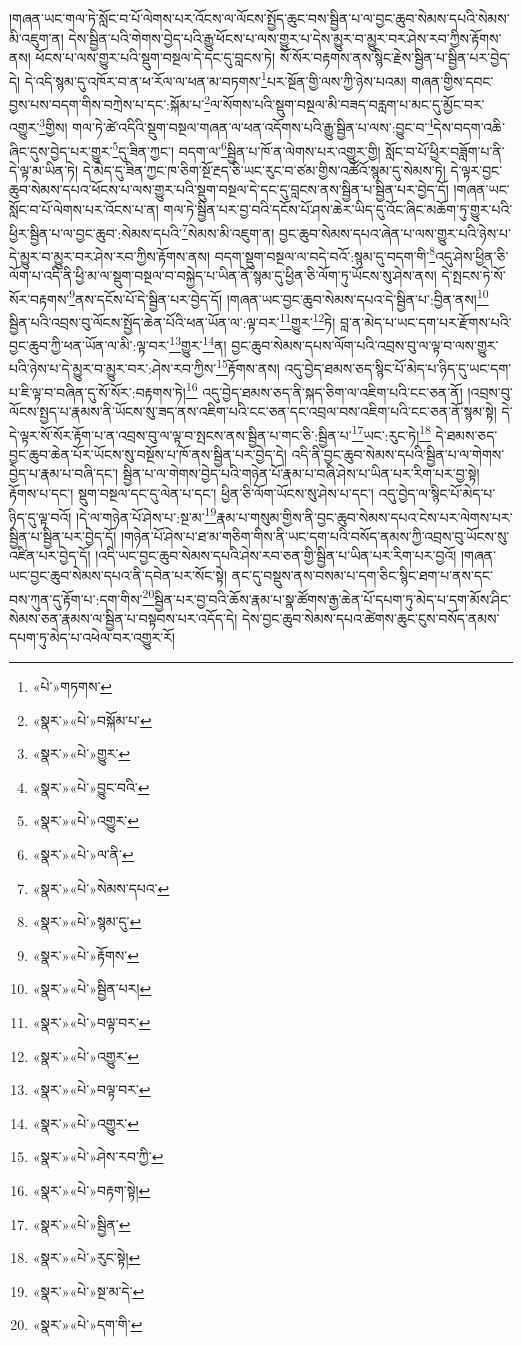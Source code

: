།གཞན་ཡང་གལ་ཏེ་སློང་བ་པོ་ལེགས་པར་འོངས་ལ་ལོངས་སྤྱོད་ཆུང་བས་སྦྱིན་པ་ལ་བྱང་ཆུབ་སེམས་དཔའི་སེམས་མི་འཇུག་ན། དེས་སྦྱིན་པའི་གེགས་བྱེད་པའི་རྒྱུ་ཕོངས་པ་ལས་གྱུར་པ་དེས་མྱུར་བ་མྱུར་བར་ཤེས་རབ་ཀྱིས་རྟོགས་ནས། ཕོངས་པ་ལས་གྱུར་པའི་སྡུག་བསྔལ་དེ་དང་དུ་བླངས་ཏེ། སོ་སོར་བརྟགས་ནས་སྙིང་རྗེས་སྦྱིན་པ་སྦྱིན་པར་བྱེད་དེ། དེ་འདི་སྙམ་དུ་འཁོར་བ་ན་ཕ་རོལ་ལ་ཕན་མ་བཏགས་\footnote{«པེ་»གཏགས་}པར་སྔོན་གྱི་ལས་ཀྱི་ཉེས་པའམ། གཞན་གྱིས་དབང་བྱས་པས་བདག་གིས་བཀྲེས་པ་དང་:སྐོམ་པ་\footnote{«སྣར་»«པེ་»བསྐོམ་པ་}ལ་སོགས་པའི་སྡུག་བསྔལ་མི་བཟད་བརླག་པ་མང་དུ་མྱོང་བར་འགྱུར་\footnote{«སྣར་»«པེ་»གྱུར་}གྱིས། གལ་ཏེ་ཚེ་འདིའི་སྡུག་བསྔལ་གཞན་ལ་ཕན་འདོགས་པའི་རྒྱུ་སྦྱིན་པ་ལས་:བྱུང་བ་\footnote{«སྣར་»«པེ་»བྱུང་བའི་}དེས་བདག་འཆི་ཞིང་དུས་བྱེད་པར་གྱུར་\footnote{«སྣར་»«པེ་»འགྱུར་}དུ་ཟིན་ཀྱང་། བདག་ལ་\footnote{«སྣར་»«པེ་»ལ་ནི་}སྦྱིན་པ་ཁོ་ན་ལེགས་པར་འགྱུར་གྱི། སློང་བ་པོ་ཕྱིར་བཟློག་པ་ནི་དེ་ལྟ་མ་ཡིན་ཏེ། དེ་མེད་དུ་ཟིན་ཀྱང་ཁ་ཅིག་སྔོ་རྔད་ཅི་ཡང་རུང་བ་ཙམ་གྱིས་འཚོའོ་སྙམ་དུ་སེམས་ཏེ། དེ་ལྟར་བྱང་ཆུབ་སེམས་དཔའ་ཕོངས་པ་ལས་གྱུར་པའི་སྡུག་བསྔལ་དེ་དང་དུ་བླངས་ནས་སྦྱིན་པ་སྦྱིན་པར་བྱེད་དོ། །གཞན་ཡང་སློང་བ་པོ་ལེགས་པར་འོངས་པ་ན། གལ་ཏེ་སྦྱིན་པར་བྱ་བའི་དངོས་པོ་ཤས་ཆེར་ཡིད་དུ་འོང་ཞིང་མཆོག་ཏུ་གྱུར་པའི་ཕྱིར་སྦྱིན་པ་ལ་བྱང་ཆུབ་:སེམས་དཔའི་\footnote{«སྣར་»«པེ་»སེམས་དཔའ་}སེམས་མི་འཇུག་ན། བྱང་ཆུབ་སེམས་དཔའ་ཞེན་པ་ལས་གྱུར་པའི་ཉེས་པ་དེ་མྱུར་བ་མྱུར་བར་ཤེས་རབ་ཀྱིས་རྟོགས་ནས། བདག་སྡུག་བསྔལ་ལ་བདེ་བའོ་:སྙམ་དུ་བདག་གི་\footnote{«སྣར་»«པེ་»སྙམ་དུ་}འདུ་ཤེས་ཕྱིན་ཅི་ལོག་པ་འདི་ནི་ཕྱི་མ་ལ་སྡུག་བསྔལ་བ་བསྐྱེད་པ་ཡིན་ནོ་སྙམ་དུ་ཕྱིན་ཅི་ལོག་ཏུ་ཡོངས་སུ་ཤེས་ནས། དེ་སྤངས་ཏེ་སོ་སོར་བརྟགས་\footnote{«སྣར་»«པེ་»རྟོགས་}ནས་དངོས་པོ་དེ་སྦྱིན་པར་བྱེད་དོ། །གཞན་ཡང་བྱང་ཆུབ་སེམས་དཔའ་དེ་སྦྱིན་པ་:བྱིན་ནས།\footnote{«སྣར་»«པེ་»སྦྱིན་པར།} སྦྱིན་པའི་འབྲས་བུ་ལོངས་སྤྱོད་ཆེན་པོའི་ཕན་ཡོན་ལ་:ལྟ་བར་\footnote{«སྣར་»«པེ་»བལྟ་བར་}གྱུར་\footnote{«སྣར་»«པེ་»འགྱུར་}ཏེ། བླ་ན་མེད་པ་ཡང་དག་པར་རྫོགས་པའི་བྱང་ཆུབ་ཀྱི་ཕན་ཡོན་ལ་མི་:ལྟ་བར་\footnote{«སྣར་»«པེ་»བལྟ་བར་}གྱུར་\footnote{«སྣར་»«པེ་»འགྱུར་}ན། བྱང་ཆུབ་སེམས་དཔས་ལོག་པའི་འབྲས་བུ་ལ་ལྟ་བ་ལས་གྱུར་པའི་ཉེས་པ་དེ་མྱུར་བ་མྱུར་བར་:ཤེས་རབ་ཀྱིས་\footnote{«སྣར་»«པེ་»ཤེས་རབ་ཀྱི་}རྟོགས་ནས། འདུ་བྱེད་ཐམས་ཅད་སྙིང་པོ་མེད་པ་ཉིད་དུ་ཡང་དག་པ་ཇི་ལྟ་བ་བཞིན་དུ་སོ་སོར་:བརྟགས་ཏེ།\footnote{«སྣར་»«པེ་»བརྟག་སྟེ།} འདུ་བྱེད་ཐམས་ཅད་ནི་སྐད་ཅིག་ལ་འཇིག་པའི་ངང་ཅན་ནོ། །འབྲས་བུ་ལོངས་སྤྱད་པ་རྣམས་ནི་ཡོངས་སུ་ཟད་ནས་འཇིག་པའི་ངང་ཅན་དང་འབྲལ་བས་འཇིག་པའི་ངང་ཅན་ནོ་སྙམ་སྟེ། དེ་དེ་ལྟར་སོ་སོར་རྟོག་པ་ན་འབྲས་བུ་ལ་ལྟ་བ་སྤངས་ནས་སྦྱིན་པ་གང་ཅི་:སྦྱིན་པ་\footnote{«སྣར་»«པེ་»སྦྱིན་}ཡང་:རུང་ཏེ།\footnote{«སྣར་»«པེ་»རུང་སྟེ།} དེ་ཐམས་ཅད་བྱང་ཆུབ་ཆེན་པོར་ཡོངས་སུ་བསྔོས་པ་ཁོ་ནས་སྦྱིན་པར་བྱེད་དེ། འདི་ནི་བྱང་ཆུབ་སེམས་དཔའི་སྦྱིན་པ་ལ་གེགས་བྱེད་པ་རྣམ་པ་བཞི་དང་། སྦྱིན་པ་ལ་གེགས་བྱེད་པའི་གཉེན་པོ་རྣམ་པ་བཞི་ཤེས་པ་ཡིན་པར་རིག་པར་བྱ་སྟེ། རྟོགས་པ་དང་། སྡུག་བསྔལ་དང་དུ་ལེན་པ་དང་། ཕྱིན་ཅི་ལོག་ཡོངས་སུ་ཤེས་པ་དང་། འདུ་བྱེད་ལ་སྙིང་པོ་མེད་པ་ཉིད་དུ་ལྟ་བའོ། །དེ་ལ་གཉེན་པོ་ཤེས་པ་:སྔ་མ་\footnote{«སྣར་»«པེ་»སྔ་མ་དེ་}རྣམ་པ་གསུམ་གྱིས་ནི་བྱང་ཆུབ་སེམས་དཔའ་ངེས་པར་ལེགས་པར་སྦྱིན་པ་སྦྱིན་པར་བྱེད་དོ། །གཉེན་པོ་ཤེས་པ་ཐ་མ་གཅིག་གིས་ནི་ཡང་དག་པའི་བསོད་ནམས་ཀྱི་འབྲས་བུ་ཡོངས་སུ་འཛིན་པར་བྱེད་དོ། །འདི་ཡང་བྱང་ཆུབ་སེམས་དཔའི་ཤེས་རབ་ཅན་གྱི་སྦྱིན་པ་ཡིན་པར་རིག་པར་བྱའོ། །གཞན་ཡང་བྱང་ཆུབ་སེམས་དཔའ་ནི་དབེན་པར་སོང་སྟེ། ནང་དུ་བསྡུས་ནས་བསམ་པ་དག་ཅིང་སྙིང་ཐག་པ་ནས་དང་བས་ཀུན་དུ་རྟོག་པ་:དག་གིས་\footnote{«སྣར་»«པེ་»དག་གི་}སྦྱིན་པར་བྱ་བའི་ཆོས་རྣམ་པ་སྣ་ཚོགས་རྒྱ་ཆེན་པོ་དཔག་ཏུ་མེད་པ་དག་མོས་ཤིང་སེམས་ཅན་རྣམས་ལ་སྦྱིན་པ་བསྟབས་པར་འདོད་དེ། དེས་བྱང་ཆུབ་སེམས་དཔའ་ཚེགས་ཆུང་ངུས་བསོད་ནམས་དཔག་ཏུ་མེད་པ་འཕེལ་བར་འགྱུར་རོ། 